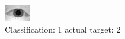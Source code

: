 \begin{figure}[h!]
\begin{center}
\includegraphics[width=0.60\columnwidth]{figures/ID920_class_1_target_2.png}
\end{center}
\caption{ Classification: 1 actual target: 2}
\label{fig:ID920_class_1_target_2}
\end{figure}
